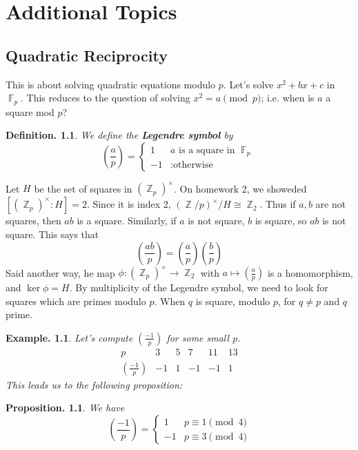 \documentclass[11pt, a4paper]{memoir}
\DeclareMathOperator{\Z}{{\mathbb{Z}}}
\DeclareMathOperator{\F}{{\mathbb{F}}}
\theoremstyle{change}
\newtheorem{proposition}[theorem]{Proposition.}
\theoremstyle{plain}
\theoremstyle{nonumberplain}
\newtheorem{definition}{Definition.}
\newtheorem{example}{Example.}
\newcommand{\lgs}[2]{\ensuremath{\left(\frac{#1}{#2}\right)}}
\newcommand{\mbf}[1]{{\boldmath\bfseries #1}}
\numberwithin{equation}{section}
\begin{document}
\chapter{Additional Topics}
\section{Quadratic Reciprocity}
This is about solving quadratic equations modulo $p$.
Let's solve $x^2+bx+c$ in $\F_p$.
This reduces to the question of solving $x^2=a\pmod{p}$; i.e. when is $a$ a square mod $p$?
\begin{definition}
    We define the \mbf{Legendre symbol} by
    \begin{equation*}
        \lgs{a}{p}=\begin{cases}1&\text{$a$ is a square in $\F_p$}\\-1&:\text{otherwise}\end{cases}
    \end{equation*}
\end{definition}
Let $H$ be the set of squares in $(\Z_p)^\times$.
On homework 2, we showeded $[(\Z_p)^\times:H]=2$.
Since it is index 2, $(\Z/p)^\times/H\cong\Z_2$.
Thus if $a,b$ are not squares, then $ab$ is a square.
Similarly, if $a$ is not square, $b$ is square, so $ab$ is not square.
This says that
\begin{equation*}
    \lgs{ab}{p}=\lgs{a}{p}\lgs{b}{p}
\end{equation*}
Said another way, he map $\phi:(\Z_p)^\times\to\Z_2$ with $a\mapsto\lgs{a}{p}$ is a homomorphism, and $\ker\phi=H$.
By multiplicity of the Legendre symbol, we need to look for squares which are primes modulo $p$.
When $q$ is square, modulo $p$, for $q\neq p$ and $q$ prime.
\begin{example}
    Let's compute $\lgs{-1}{p}$ for some small $p$.
    \begin{equation*}
        \begin{array}{c|c|c|c|c|c}
            p&3&5&7&11&13\\
            \lgs{-1}{p}&-1&1&-1&-1&1
        \end{array}
    \end{equation*}
    This leads us to the following proposition:
\end{example}
\begin{proposition}
    We have
    \begin{equation*}
        \lgs{-1}{p}=
        \begin{cases}
            1&p\equiv 1\pmod{4}\\
            -1&p\equiv 3\pmod{4}
        \end{cases}
    \end{equation*}
\end{proposition}
\end{document}
